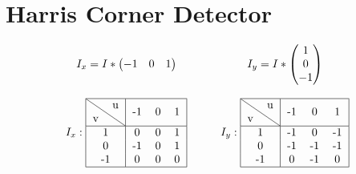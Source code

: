 \section{Harris Corner Detector}

$$
	\begin{array}{ccc}
		I_x  = I \ast \begin{pmatrix} -1 & 0 & 1 \end{pmatrix} & \phantom{\quad} & I_y  = I \ast \begin{pmatrix} 1\\  0 \\- 1 \end{pmatrix} \\[24pt]
		I_x  : \begin{tabular}{|c|ccc|}
			       \hline
			       \diagbox{v}{u} & -1 & 0 & 1 \\
			       \hline
			       1              & 0  & 0 & 1 \\
			       0              & -1 & 0 & 1 \\
			       -1             & 0  & 0 & 0 \\
			       \hline
		       \end{tabular}                        &                 & I_y  : \begin{tabular}{|c|ccc|}
			                                                                       \hline
			                                                                       \diagbox{v}{u} & -1 & 0  & 1  \\
			                                                                       \hline
			                                                                       1              & -1 & 0  & -1 \\
			                                                                       0              & -1 & -1 & -1 \\
			                                                                       -1             & 0  & -1 & 0  \\
			                                                                       \hline
		                                                                       \end{tabular}
	\end{array}
$$\\
